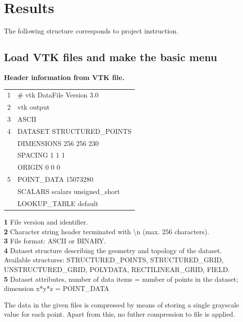 \chapter{Results}
The following structure corresponds to project instruction.


\section{Load VTK files and make the basic menu} 

\textbf{Header information from VTK file.}

\begin{table}[h]
	\ttfamily
	\small
	\begin{tabular}{l|l}
		1 & \# vtk DataFile Version 3.0     \\
		2 & vtk output                      \\
		3 & ASCII                           \\
		4 & DATASET STRUCTURED\_POINTS      \\
		& DIMENSIONS 256 256 230          \\
		& SPACING 1 1 1                   \\
		& ORIGIN 0 0 0                    \\
		5 & POINT\_DATA 15073280            \\
		& SCALARS scalars unsigned\_short \\
		& LOOKUP\_TABLE default          
	\end{tabular}
\end{table}

\noindent
\textbf{1} File version and identifier.\\
\textbf{2} Character string header terminated with \textbackslash n (max. 256 characters).\\
\textbf{3} File format: ASCII or BINARY.\\
\textbf{4} Dataset structure describing the geometry and topology of the dataset. Available structures: STRUCTURED\_POINTS, STRUCTURED\_GRID, UNSTRUCTURED\_GRID, POLYDATA, RECTILINEAR\_GRID, FIELD.\\
\textbf{5} Dataset attributes, number of data items = number of points in the dataset; dimension x*y*z = POINT\_DATA

The data in the given files is compressed by means of storing a single grayscale value for each point. Apart from this, no futher compression to file is applied.

